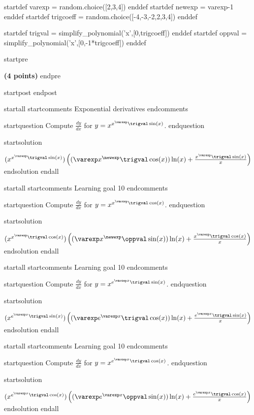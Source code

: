 startdef varexp = random.choice([2,3,4]) enddef
startdef newexp = varexp-1 enddef
startdef trigcoeff = random.choice([-4,-3,-2,2,3,4]) enddef

startdef trigval = simplify_polynomial('x',[0,trigcoeff]) enddef
startdef oppval = simplify_polynomial('x',[0,-1*trigcoeff]) enddef


startpre \item {\bf (4 points)} endpre

startpost
\vfill 
endpost



startall
startcomments 
Exponential derivatives
endcomments

startquestion Compute $\frac{dy}{dx}$ for $y=x^{x^\varexp \trigval \sin(x)}$.
endquestion

startsolution
\item $(x^{x^\varexp \trigval \sin(x)}) \left( (\varexp x^{\newexp} \trigval \cos(x))\ln(x) + \frac{x^\varexp \trigval \sin(x)}{x} \right)$
endsolution
endall




startall
startcomments 
Learning goal 10
endcomments

startquestion Compute $\frac{dy}{dx}$ for $y=x^{x^\varexp \trigval \cos(x)}$.
endquestion

startsolution
\item $(x^{x^\varexp \trigval \cos(x)}) \left( (\varexp x^{\newexp} \oppval \sin(x))\ln(x) + \frac{x^\varexp \trigval \cos(x)}{x} \right)$
endsolution
endall




startall
startcomments 
Learning goal 10
endcomments

startquestion Compute $\frac{dy}{dx}$ for $y=x^{e^{\varexp x} \trigval \sin(x)}$.
endquestion

startsolution
\item $(x^{e^{\varexp x} \trigval \sin(x)}) \left( (\varexp e^{\varexp x} \trigval \cos(x))\ln(x) + \frac{e^{\varexp x} \trigval \sin(x)}{x} \right)$
endsolution
endall



startall
startcomments 
Learning goal 10
endcomments

startquestion Compute $\frac{dy}{dx}$ for $y=x^{e^{\varexp x} \trigval \cos(x)}$.
endquestion

startsolution
\item $(x^{e^{\varexp x} \trigval \cos(x)}) \left( (\varexp e^{\varexp x} \oppval \sin(x))\ln(x) + \frac{e^{\varexp x} \trigval \cos(x)}{x} \right)$
endsolution
endall



